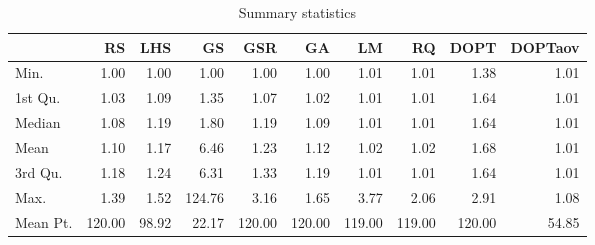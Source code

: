 \documentclass[final,12pt,a4paper]{article}
\begin{document}
\begin{table}[ht]
\centering
\begin{tabular}{lrrrrrrrrr}
  \hline
 & RS & LHS & GS & GSR & GA & LM & RQ & DOPT & DOPTaov \\ 
  \hline
Min. & 1.00 & 1.00 & 1.00 & 1.00 & 1.00 & 1.01 & 1.01 & 1.38 & 1.01 \\ 
  1st Qu. & 1.03 & 1.09 & 1.35 & 1.07 & 1.02 & 1.01 & 1.01 & 1.64 & 1.01 \\ 
  Median & 1.08 & 1.19 & 1.80 & 1.19 & 1.09 & 1.01 & 1.01 & 1.64 & 1.01 \\ 
  Mean & 1.10 & 1.17 & 6.46 & 1.23 & 1.12 & 1.02 & 1.02 & 1.68 & 1.01 \\ 
  3rd Qu. & 1.18 & 1.24 & 6.31 & 1.33 & 1.19 & 1.01 & 1.01 & 1.64 & 1.01 \\ 
  Max. & 1.39 & 1.52 & 124.76 & 3.16 & 1.65 & 3.77 & 2.06 & 2.91 & 1.08 \\ 
  Mean Pt. & 120.00 & 98.92 & 22.17 & 120.00 & 120.00 & 119.00 & 119.00 & 120.00 & 54.85 \\ 
   \hline
\end{tabular}
\caption{Summary statistics} 
\end{table}
\end{document}
